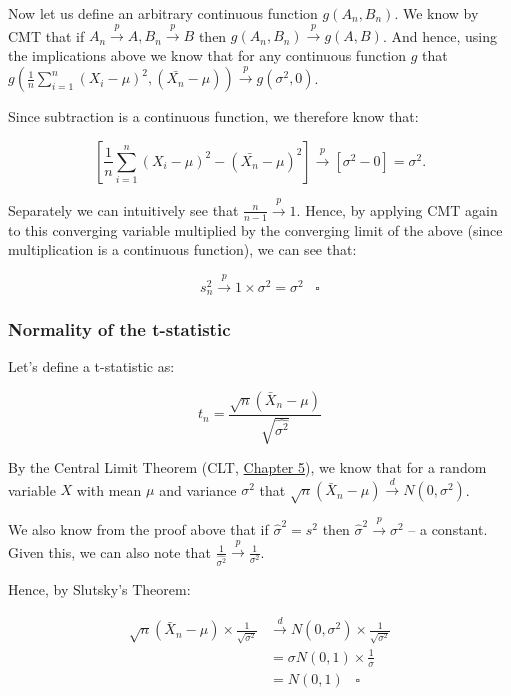 \documentclass[
]{book}
\begin{document}
Now let us define an arbitrary continuous function \(g(A_n,B_n)\). We know by CMT that if \(A_n \xrightarrow{p} A, B_n \xrightarrow{p} B\) then \(g(A_n, B_n) \xrightarrow{p} g(A,B)\). And hence, using the implications above we know that for any continuous function \(g\) that \(g(\frac{1}{n}\sum_{i=1}^n(X_i - \mu)^2, (\bar{X_n} - \mu)) \xrightarrow{p} g(\sigma^2,0)\).

Since subtraction is a continuous function, we therefore know that:

\[ \left[\frac{1}{n}\sum_{i=1}^n(X_i - \mu)^2 - (\bar{X_n}-\mu)^2\right] \xrightarrow{p} \left[\sigma^2 - 0\right] = \sigma^2.\]

Separately we can intuitively see that \(\frac{n}{n-1} \xrightarrow{p} 1.\) Hence, by applying CMT again to this converging variable multiplied by the converging limit of the above (since multiplication is a continuous function), we can see that:

\[ s^2_n \xrightarrow{p} 1 \times \sigma^2 = \sigma^2 \;\;\; \square\]

\hypertarget{normality-of-the-t-statistic}{%
\subsubsection{Normality of the t-statistic}\label{normality-of-the-t-statistic}}

Let's define a t-statistic as:

\[ t_n = \frac{\sqrt{n}(\bar{X}_n-\mu)}{\sqrt{\hat{\sigma^2}}}\]

By the Central Limit Theorem (CLT, \protect\hyperlink{wlln}{Chapter 5}), we know that for a random variable \(X\) with mean \(\mu\) and variance \(\sigma^2\) that \(\sqrt{n}(\bar{X}_n - \mu) \xrightarrow{d} N(0,\sigma^2)\).

We also know from the proof above that if \(\hat{\sigma}^2 = s^2\) then \(\hat{\sigma}^2 \xrightarrow{p} \sigma^2\) -- a constant. Given this, we can also note that \(\frac{1}{\hat{\sigma^2}} \xrightarrow{p} \frac{1}{\sigma^2}\).

Hence, by Slutsky's Theorem:

\begin{align}
\sqrt{n}(\bar{X}_n-\mu) \times \frac{1}{\sqrt{\sigma^2}} &\xrightarrow{d} N(0,\sigma^2) \times \frac{1}{\sqrt{\sigma^2}} \\
&= \sigma N(0,1) \times \frac{1}{\sigma}\\
&= N(0,1) \;\;\; \square
\end{align}
\end{document}
